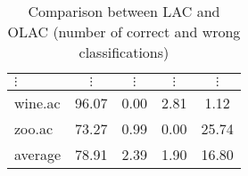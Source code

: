 \begin{table}[htbp]
\begin{tabular}{|l|c|c|c|c|}
		$\vdots$        & $\vdots$      & $\vdots$           & $\vdots$                 & $\vdots$                      \\
		\hline
		wine.ac         & 96.07         & 0.00               & 2.81                     & 1.12                          \\
		\hline
		zoo.ac          & 73.27         & 0.99               & 0.00                     & 25.74                         \\
		\hline
		average         & 78.91         & 2.39               & 1.90                     & 16.80                         \\
		\hline
		\end{tabular}
	\caption{Comparison between LAC and OLAC (number of correct and wrong classifications)}
	\label{tab:comparison_lac_olac}
\end{table}
